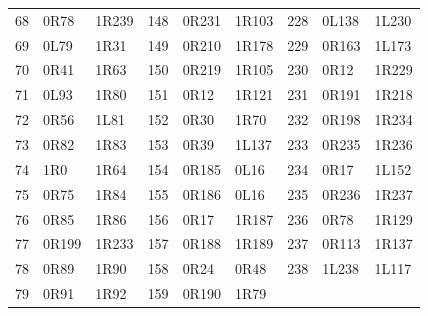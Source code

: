 \begin{longtable}{rll@{\hspace{1.3em}}rll@{\hspace{1.3em}}rll}
68 & 0R78 & 1R239 & 148 & 0R231 & 1R103 & 228 & 0L138 & 1L230 \\
69 & 0L79 & 1R31 & 149 & 0R210 & 1R178 & 229 & 0R163 & 1L173 \\
70 & 0R41 & 1R63 & 150 & 0R219 & 1R105 & 230 & 0R12 & 1R229 \\
71 & 0L93 & 1R80 & 151 & 0R12 & 1R121 & 231 & 0R191 & 1R218 \\
72 & 0R56 & 1L81 & 152 & 0R30 & 1R70 & 232 & 0R198 & 1R234 \\
73 & 0R82 & 1R83 & 153 & 0R39 & 1L137 & 233 & 0R235 & 1R236 \\
74 & 1R0 & 1R64 & 154 & 0R185 & 0L16 & 234 & 0R17 & 1L152 \\
75 & 0R75 & 1R84 & 155 & 0R186 & 0L16 & 235 & 0R236 & 1R237 \\
76 & 0R85 & 1R86 & 156 & 0R17 & 1R187 & 236 & 0R78 & 1R129 \\
77 & 0R199 & 1R233 & 157 & 0R188 & 1R189 & 237 & 0R113 & 1R137 \\
78 & 0R89 & 1R90 & 158 & 0R24 & 0R48 & 238 & 1L238 & 1L117 \\
79 & 0R91 & 1R92 & 159 & 0R190 & 1R79 &  &  &  \\
\end{longtable}
\endgroup
